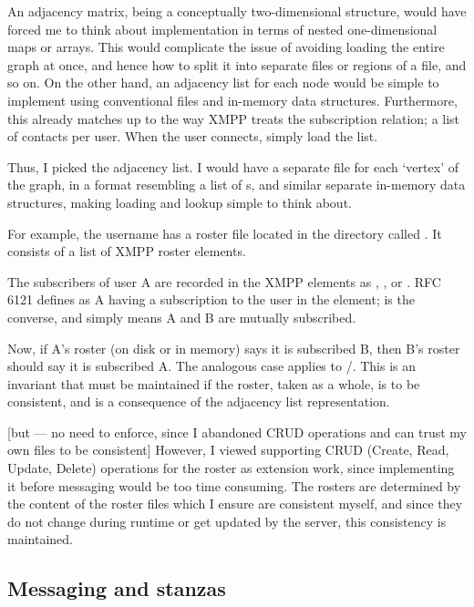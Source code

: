 \documentclass[12pt,a4paper,twoside,openright]{report}
\begin{document}
{An adjacency matrix, being a conceptually two-dimensional structure, would have forced me to think about implementation in terms of nested one-dimensional maps or arrays. This would complicate the issue of avoiding loading the entire graph at once, and hence how to split it into separate files or regions of a file, and so on. On the other hand, an adjacency list for each node would be simple to implement using conventional files and in-memory data structures. Furthermore, this already matches up to the way XMPP treats the subscription relation; a list of contacts per user. When the user connects, simply load the list.

Thus, I picked the adjacency list. I would have a separate file for each `vertex' of the graph, in a format resembling a list of s, and similar separate in-memory data structures, making loading and lookup simple to think about.

For example, the username  has a roster file located in the  directory called . It consists of a list of XMPP roster  elements.

The subscribers of user A are recorded in the XMPP  elements as , , or . RFC 6121 defines  as A having a subscription to the user in the  element;  is the converse, and  simply means A and B are mutually subscribed.

Now, if A's roster (on disk or in memory) says it is subscribed  B, then B's roster should say it is subscribed  A. The analogous case applies to /. This is an invariant that must be maintained if the roster, taken as a whole, is to be consistent, and is a consequence of the adjacency list representation.

[but --- no need to enforce, since I abandoned CRUD operations and can trust my own files to be consistent]
However, I viewed supporting CRUD (Create, Read, Update, Delete) operations for the roster as extension work, since implementing it before messaging would be too time consuming. The rosters are determined by the content of the roster files which I ensure are consistent myself, and since they do not change during runtime or get updated by the server, this consistency is maintained.

\subsection{Messaging and stanzas}

}
\end{document}
